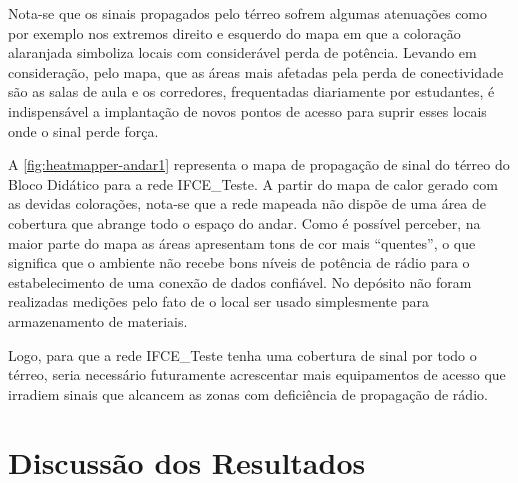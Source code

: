 Nota-se que os sinais propagados pelo térreo sofrem algumas atenuações como por exemplo nos extremos direito e esquerdo do mapa em que a coloração alaranjada simboliza locais com considerável perda de potência. Levando em consideração, pelo mapa, que as áreas mais afetadas pela perda de conectividade são as salas de aula e os corredores, frequentadas diariamente por estudantes, é indispensável a implantação de novos pontos de acesso para suprir esses locais onde o sinal perde força.

A \autoref{fig:heatmapper-andar1} representa o mapa de propagação de sinal do térreo do Bloco Didático para a rede IFCE\_Teste. A partir do mapa de calor gerado com as devidas colorações, nota-se que a rede mapeada não dispõe de uma área de cobertura que abrange todo o espaço do andar. Como é possível perceber, na maior parte do mapa as áreas apresentam tons de cor mais ``quentes'', o que significa que o ambiente não recebe bons níveis de potência de rádio para o estabelecimento de uma conexão de dados confiável. No depósito não foram realizadas medições pelo fato de o local ser usado simplesmente para armazenamento de materiais.

Logo, para que a rede IFCE\_Teste tenha uma cobertura de sinal por todo o térreo, seria necessário futuramente acrescentar mais equipamentos de acesso que irradiem sinais que alcancem as zonas com deficiência de propagação de rádio.

\begin{figure}[H]
	\centering
\end{figure}


\section{Discussão dos Resultados}
\label{discussao-dos-resultados}

